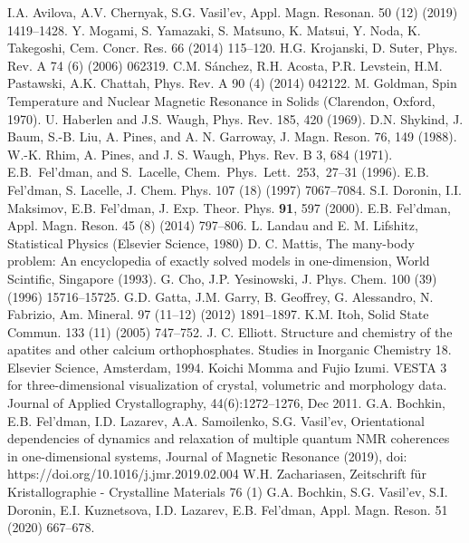 \begin{thebibliography}{}
  I.A. Avilova, A.V. Chernyak, S.G. Vasil’ev, Appl. Magn. Resonan. 50 (12) (2019) 1419–1428.
  Y. Mogami, S. Yamazaki, S. Matsuno, K. Matsui, Y. Noda, K. Takegoshi, Cem. Concr. Res. 66 (2014) 115–120.
  H.G. Krojanski, D. Suter, Phys. Rev. A 74 (6) (2006) 062319.
  C.M. Sánchez, R.H. Acosta, P.R. Levstein, H.M. Pastawski, A.K. Chattah, Phys. Rev. A 90 (4) (2014) 042122.
  M. Goldman, Spin Temperature and Nuclear Magnetic Resonance in Solids (Clarendon, Oxford, 1970).
  U. Haberlen and J.S. Waugh, Phys. Rev. 185, 420 (1969).
  D.N. Shykind, J. Baum, S.-B. Liu, A. Pines, and A. N. Garroway, J. Magn. Reson. 76, 149 (1988).
  W.-K. Rhim, A. Pines, and J. S. Waugh, Phys. Rev. B 3, 684 (1971).
  E.B.~Fel’dman, and S.~Lacelle, Chem.~Phys.~Lett.~253,~27–31 (1996).
  E.B. Fel’dman, S. Lacelle, J. Chem. Phys. 107 (18) (1997) 7067–7084.
   S.I. Doronin, I.I. Maksimov, E.B. Fel'dman, J. Exp. Theor. Phys. {\bf 91}, 597 (2000).
  E.B. Fel’dman, Appl. Magn. Reson. 45 (8) (2014) 797–806.
  L. Landau and E. M. Lifshitz, Statistical Physics (Elsevier Science, 1980)
  D. C. Mattis, The many-body problem: An encyclopedia of exactly solved models in one-dimension, World Scintific, Singapore (1993).
  G. Cho, J.P. Yesinowski, J. Phys. Chem. 100 (39) (1996) 15716–15725.
  G.D. Gatta, J.M. Garry, B. Geoffrey, G. Alessandro, N. Fabrizio, Am. Mineral. 97 (11–12) (2012) 1891–1897.
  K.M. Itoh, Solid State Commun. 133 (11) (2005) 747–752.
  J. C. Elliott. Structure and chemistry of the apatites and other calcium orthophosphates. Studies in Inorganic Chemistry 18. Elsevier Science, Amsterdam, 1994.
  Koichi Momma and Fujio Izumi. VESTA 3 for three-dimensional visualization of crystal, volumetric and morphology data. Journal of Applied Crystallography, 44(6):1272–1276, Dec 2011.
  G.A. Bochkin, E.B. Fel’dman, I.D. Lazarev, A.A. Samoilenko, S.G. Vasil’ev, Orientational dependencies of dynamics and relaxation of multiple quantum NMR coherences in one-dimensional systems, Journal of Magnetic Resonance (2019), doi: https://doi.org/10.1016/j.jmr.2019.02.004
  W.H. Zachariasen, Zeitschrift für Kristallographie - Crystalline Materials 76 (1) %
  G.A. Bochkin, S.G. Vasil’ev, S.I. Doronin, E.I. Kuznetsova, I.D. Lazarev, E.B. Fel’dman, Appl. Magn. Reson. 51 (2020) 667–678.

\end{thebibliography}
